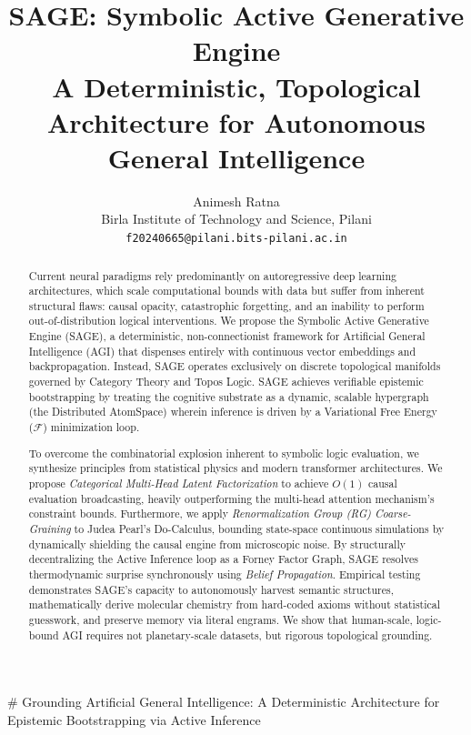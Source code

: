 \documentclass[10pt,twocolumn,letterpaper]{article}
\begin{document}
\title{SAGE: Symbolic Active Generative Engine \\
A Deterministic, Topological Architecture for Autonomous General Intelligence}

\author{Animesh Ratna\\
Birla Institute of Technology and Science, Pilani\\
{\tt\small f20240665@pilani.bits-pilani.ac.in}
}

\maketitle
# Grounding Artificial General Intelligence: A Deterministic Architecture for Epistemic Bootstrapping via Active Inference

\begin{abstract}

Current neural paradigms rely predominantly on autoregressive deep learning architectures, which scale computational bounds with data but suffer from inherent structural flaws: causal opacity, catastrophic forgetting, and an inability to perform out-of-distribution logical interventions. We propose the Symbolic Active Generative Engine (SAGE), a deterministic, non-connectionist framework for Artificial General Intelligence (AGI) that dispenses entirely with continuous vector embeddings and backpropagation. Instead, SAGE operates exclusively on discrete topological manifolds governed by Category Theory and Topos Logic. SAGE achieves verifiable epistemic bootstrapping by treating the cognitive substrate as a dynamic, scalable hypergraph (the Distributed AtomSpace) wherein inference is driven by a Variational Free Energy ($\mathcal{F}$) minimization loop.

To overcome the combinatorial explosion inherent to symbolic logic evaluation, we synthesize principles from statistical physics and modern transformer architectures. We propose \textit{Categorical Multi-Head Latent Factorization} to achieve $O(1)$ causal evaluation broadcasting, heavily outperforming the multi-head attention mechanism's constraint bounds. Furthermore, we apply \textit{Renormalization Group (RG) Coarse-Graining} to Judea Pearl’s Do-Calculus, bounding state-space continuous simulations by dynamically shielding the causal engine from microscopic noise. By structurally decentralizing the Active Inference loop as a Forney Factor Graph, SAGE resolves thermodynamic surprise synchronously using \textit{Belief Propagation}. Empirical testing demonstrates SAGE's capacity to autonomously harvest semantic structures, mathematically derive molecular chemistry from hard-coded axioms without statistical guesswork, and preserve memory via literal engrams. We show that human-scale, logic-bound AGI requires not planetary-scale datasets, but rigorous topological grounding.



\end{abstract}
\end{document}
